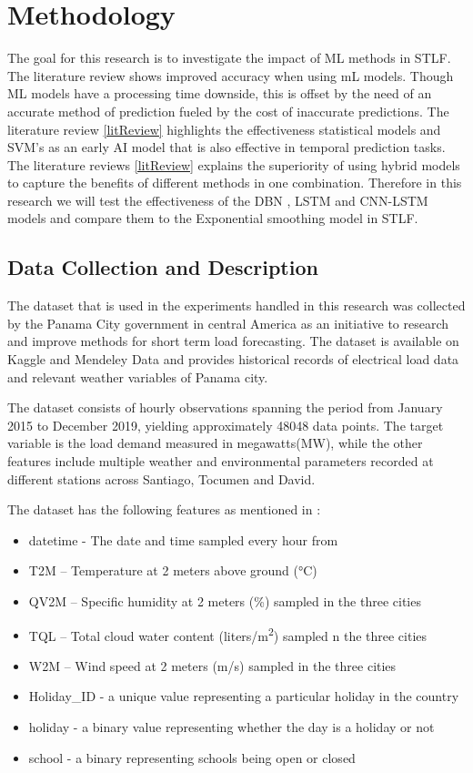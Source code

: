 \chapter{Methodology}

The goal for this research is to investigate the impact of ML methods in STLF. The literature review shows improved accuracy when using mL models. Though ML models have a processing time downside, this is offset by the need of an accurate method of prediction fueled by the cost of inaccurate predictions. The literature review \ref{litReview} highlights the effectiveness statistical models and SVM's as an early AI model that is also effective in temporal prediction tasks. The literature reviews \ref{litReview} explains the superiority of using hybrid models to capture the benefits of different methods in one combination. Therefore in this research we will test the effectiveness of the DBN , LSTM and CNN-LSTM models and compare them to the Exponential smoothing model in STLF. 

\section{Data Collection and Description}
The dataset that is used in the experiments handled in this research was collected by the Panama City government in central America as an initiative to research and improve  methods for short term load forecasting. The dataset is available on Kaggle and  Mendeley Data and provides historical records of electrical load data and relevant weather variables of Panama city\cite{dataset}.

The dataset consists of hourly observations spanning the period from January 2015 to December 2019, yielding approximately 48048 data points. The target variable is the load demand measured in megawatts(MW), while the other features include multiple weather and environmental parameters recorded at different stations across Santiago, Tocumen and David. 

The dataset has the following features as mentioned in \cite{dataset}:
\begin{itemize}
	\item datetime - The date and time sampled every hour from 
	\item T2M – Temperature at 2 meters above ground (°C)
	\item QV2M – Specific humidity at 2 meters (\%) sampled in the three cities
	\item TQL – Total cloud water content (liters/\si{m^2}) sampled n the three cities
	\item W2M – Wind speed at 2 meters (m/s) sampled in the three cities
	\item Holiday\_ID - a unique value representing a particular holiday in the country
	\item holiday - a binary value representing whether the day is a holiday or not
	\item school - a binary representing schools being open or closed 
	
\end{itemize}


